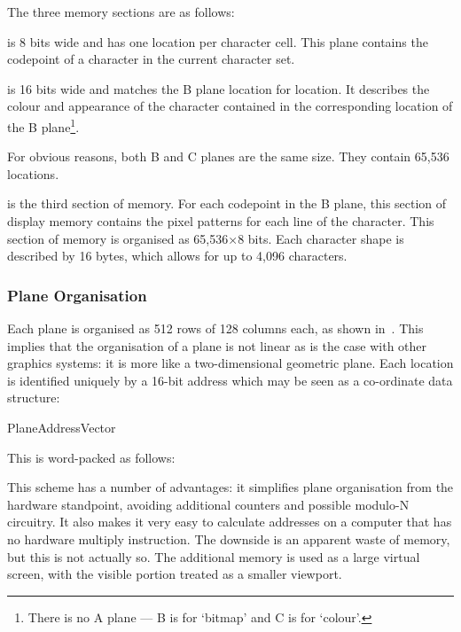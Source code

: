 The three memory sections are as follows:

\begin{description}
   is 8 bits wide and has one location per character cell. This plane
  contains the \gls{codepoint} of a character in the current character set.

   is 16 bits wide and matches the B plane location for location. It
  describes the colour and appearance of the character contained in the
  corresponding location of the B plane\footnote{There is no A plane — B is for
    ‘bitmap’ and C is for ‘colour’.}.

  For obvious reasons, both B and C planes are the same size. They contain 65,536
  locations.

   is the third section of memory. For each
  codepoint in the B plane, this section of display memory contains the pixel
  patterns for each line of the character. This section of memory is organised as
  65,536×8 bits. Each character shape is described by 16 bytes, which allows for
  up to 4,096 characters.
\end{description}


\subsubsection{Plane Organisation}

Each plane is organised as 512 rows of 128 columns each, as shown
in~. This implies that the organisation of a plane is not
linear as is the case with other graphics systems: it is more like a
two-dimensional geometric plane. Each location is identified uniquely by a
16-bit address which may be seen as a co-ordinate data structure:


\begin{bitfield}
\end{bitfield}

\begin{datastructure}[Bits]{PlaneAddressVector}
\end{datastructure}

\noindent This is word-packed as follows:

\noindent This scheme has a number of advantages: it simplifies plane
organisation from the hardware standpoint, avoiding additional counters and
possible modulo-N circuitry. It also makes it very easy to calculate addresses
on a computer that has no hardware multiply instruction. The downside is an
apparent waste of memory, but this is not actually so. The additional memory is
used as a large virtual screen, with the visible portion treated as a smaller
viewport.

